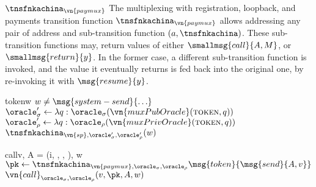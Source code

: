\begin{transitionfn}{$\tnsfnkachina_{\vn{paymux}}$}
  The multiplexing with registration, loopback, and payments transition function
  $\tnsfnkachina_{\vn{paymux}}$ allows addressing any pair of address and
  sub-transition function $(a, \tnsfnkachina)$. These sub-transition functions may,
  return values of either $\smallmsg{call}{A, M}$, or $\smallmsg{return}{y}$. In the
  former case, a different sub-transition function is invoked, and the value it
  eventually returns is fed back into the original one, by re-invoking it with
  $\msg{resume}{y}$.

  \begin{pubstatedecl}
  \end{pubstatedecl}%
  \vspace{-1em}
  \begin{privstatedecl}
  \end{privstatedecl}

  \begin{receiveinput}{token}{w}
    \State \Assert $w \neq \msg{system-send}{\ldots}$
    \State \Let $\oracle_\sigma' \gets \lambda q :
      \oracle_\sigma(\vn{muxPubOracle}(\textsc{token}, q))$
    \State \Let $\oracle_\rho' \gets \lambda q :
      \oracle_\rho(\vn{muxPrivOracle}(\textsc{token}, q))$
    \State \Return $\tnsfnkachina_{\vn{sp},\oracle_\sigma', \oracle_\rho'}(w)$
  \end{receiveinput}

  \begin{receiveinput}{call}{v, A = (i, \tnsfnkachina, , ), w}
    \State \Let $\pk \gets \tnsfnkachina_{\vn{paymux},\oracle_\sigma,\oracle_\rho}\msg{token}{\msg{send}{A, v}}$
    \State \Return $\vn{call}_{\oracle_\sigma,\oracle_\rho}(v, \pk, A, w)$
  \end{receiveinput}


\end{transitionfn}

